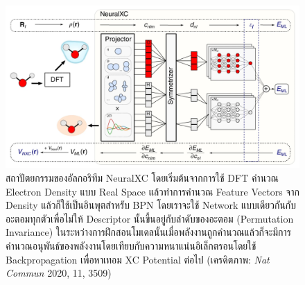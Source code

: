 \begin{figure}[H]
    \centering
    \includegraphics[width=0.9\linewidth]{fig/neuralxc.png}
    \caption{สถาปัตยกรรมของอัลกอริทึม NeuralXC โดยเริ่มต้นจากการใช้ DFT คำนวณ Electron Density แบบ Real Space แล้วทำการคำนวณ Feature Vectors จาก Density แล้วก็ใช้เป็นอินพุตสำหรับ BPN โดยเราจะใช้ Network แบบเดียวกันกับอะตอมทุกตัวเพื่อไม่ให้ Descriptor นั้นขึ้นอยู่กับลำดับของอะตอม (Permutation Invariance) ในระหว่างการฝึกสอนโมเดลนั้นเมื่อพลังงานถูกคำนวณแล้วก็จะมีการคำนวณอนุพันธ์ของพลังงานโดยเทียบกับความหนาแน่นอิเล็กตรอนโดยใช้ Backpropagation เพื่อหาเทอม XC Potential ต่อไป (เครดิตภาพ: \textit{Nat Commun} 2020, 11, 3509)}
    \label{fig:neuralxc}
\end{figure}

